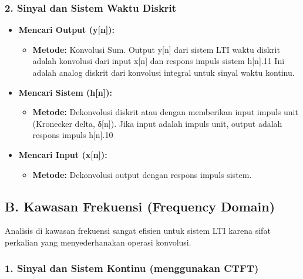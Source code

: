 \documentclass[
  letterpaper,
  DIV=11,
  numbers=noendperiod]{scrreprt}
\providecommand{\tightlist}{%
  \setlength{\itemsep}{0pt}\setlength{\parskip}{0pt}}\usepackage{longtable,booktabs,array}
\begin{document}
\subsubsection{2. Sinyal dan Sistem Waktu
Diskrit}\label{sinyal-dan-sistem-waktu-diskrit}

\begin{itemize}
\item
  \textbf{Mencari Output (y{[}n{]}):}

  \begin{itemize}
  \tightlist
  \item
    \textbf{Metode:} Konvolusi Sum. Output y{[}n{]} dari sistem LTI
    waktu diskrit adalah konvolusi dari input x{[}n{]} dan respons
    impuls sistem h{[}n{]}.11 Ini adalah analog diskrit dari konvolusi
    integral untuk sinyal waktu kontinu.
  \end{itemize}
\item
  \textbf{Mencari Sistem (h{[}n{]}):}

  \begin{itemize}
  \tightlist
  \item
    \textbf{Metode:} Dekonvolusi diskrit atau dengan memberikan input
    impuls unit (Kronecker delta, δ{[}n{]}). Jika input adalah impuls
    unit, output adalah respons impuls h{[}n{]}.10
  \end{itemize}
\item
  \textbf{Mencari Input (x{[}n{]}):}

  \begin{itemize}
  \tightlist
  \item
    \textbf{Metode:} Dekonvolusi output dengan respons impuls sistem.
  \end{itemize}
\end{itemize}

\subsection{B. Kawasan Frekuensi (Frequency
Domain)}\label{b.-kawasan-frekuensi-frequency-domain-1}

Analisis di kawasan frekuensi sangat efisien untuk sistem LTI karena
sifat perkalian yang menyederhanakan operasi konvolusi.

\subsubsection{1. Sinyal dan Sistem Kontinu (menggunakan
CTFT)}\label{sinyal-dan-sistem-kontinu-menggunakan-ctft}
\end{document}

